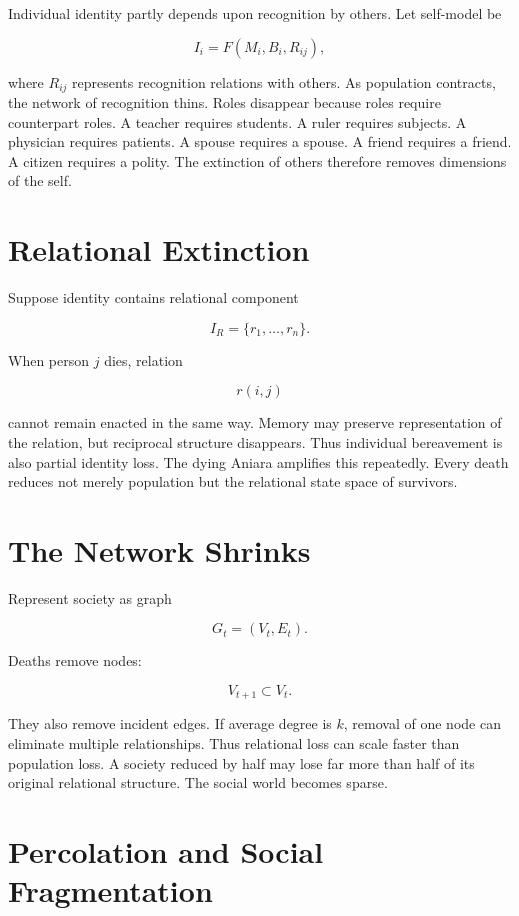 \documentclass[11pt,oneside]{book}
\theoremstyle{definition}
\theoremstyle{remark}
\begin{document}
Individual identity partly depends upon recognition by others. Let self-model be

\[
I_i = F(M_i,B_i,R_{ij}),
\]

where \(R_{ij}\) represents recognition relations with others. As population contracts, the network
of recognition thins. Roles disappear because roles require counterpart roles. A teacher requires
students. A ruler requires subjects. A physician requires patients. A spouse requires a spouse. A
friend requires a friend. A citizen requires a polity. The extinction of others therefore removes
dimensions of the self.

\section{Relational Extinction}

Suppose identity contains relational component

\[
I_R = \{r_1,\ldots,r_n\}.
\]

When person \(j\) dies, relation

\[
r(i,j)
\]

cannot remain enacted in the same way. Memory may preserve representation of the relation, but
reciprocal structure disappears. Thus individual bereavement is also partial identity loss. The
dying Aniara amplifies this repeatedly. Every death reduces not merely population but the relational
state space of survivors.

\section{The Network Shrinks}

Represent society as graph

\[
G_t=(V_t,E_t).
\]

Deaths remove nodes:

\[
V_{t+1}\subset V_t.
\]

They also remove incident edges. If average degree is \(k\), removal of one node can eliminate
multiple relationships. Thus relational loss can scale faster than population loss. A society
reduced by half may lose far more than half of its original relational structure. The social world
becomes sparse.

\section{Percolation and Social Fragmentation}
\end{document}
